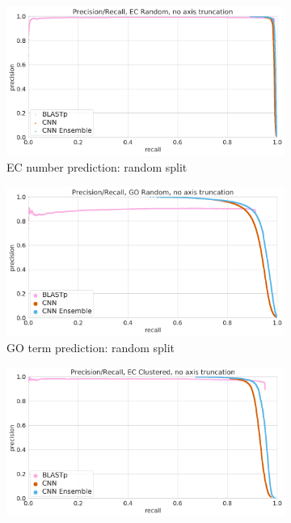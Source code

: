 \begin{figure}[ht] 
  \begin{subfigure}[b]{0.5\linewidth}
    \centering
    \includegraphics[width=0.9\linewidth]{Figures/prc_ec_random_unzoomed.png}
    \caption{EC number prediction: random split} 
    \label{fig:without_ensemble:a} 
    \vspace{4ex}
  \end{subfigure}%
  \begin{subfigure}[b]{0.5\linewidth}
    \centering
    \includegraphics[width=0.9\linewidth]{Figures/prc_go_random_unzoomed.png}
    \caption{GO term prediction: random split} 
    \label{fig:without_ensemble:b} 
    \vspace{4ex}
  \end{subfigure} 
  \begin{subfigure}[b]{0.5\linewidth}
    \centering
    \includegraphics[width=0.9\linewidth]{Figures/prc_ec_clustered_unzoomed.png}

\end{subfigure}
\end{figure}
